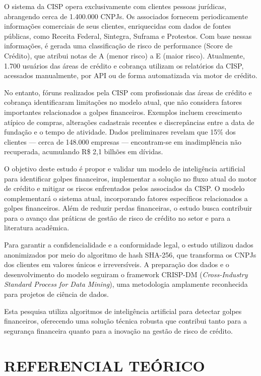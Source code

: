 \documentclass[12pt,a4paper]{article}
\begin{document}
O sistema da CISP opera exclusivamente com clientes pessoas jurídicas, abrangendo cerca de 1.400.000 CNPJs. Os associados fornecem periodicamente informações comerciais de seus clientes, enriquecidas com dados de fontes públicas, como Receita Federal, Sintegra, Suframa e Protestos. Com base nessas informações, é gerada uma classificação de risco de performance (Score de Crédito), que atribui notas de A (menor risco) a E (maior risco). Atualmente, 1.700 usuários das áreas de crédito e cobrança utilizam os relatórios da CISP, acessados manualmente, por API ou de forma automatizada via motor de crédito.

No entanto, fóruns realizados pela CISP com profissionais das áreas de crédito e cobrança identificaram limitações no modelo atual, que não considera fatores importantes relacionados a golpes financeiros. Exemplos incluem crescimento atípico de compras, alterações cadastrais recentes e discrepâncias entre a data de fundação e o tempo de atividade. Dados preliminares revelam que 15\% dos clientes — cerca de 148.000 empresas — encontram-se em inadimplência não recuperada, acumulando R\$ 2,1 bilhões em dívidas.

O objetivo deste estudo é propor e validar um modelo de inteligência artificial para identificar golpes financeiros, implementar a solução no fluxo atual do motor de crédito e mitigar os riscos enfrentados pelos associados da CISP. O modelo complementará o sistema atual, incorporando fatores específicos relacionados a golpes financeiros. Além de reduzir perdas financeiras, o estudo busca contribuir para o avanço das práticas de gestão de risco de crédito no setor e para a literatura acadêmica.

Para garantir a confidencialidade e a conformidade legal, o estudo utilizou dados anonimizados por meio do algoritmo de hash SHA-256, que transforma os CNPJs dos clientes em valores únicos e irreversíveis. A preparação dos dados e o desenvolvimento do modelo seguiram o framework CRISP-DM (\textit{Cross-Industry Standard Process for Data Mining}), uma metodologia amplamente reconhecida para projetos de ciência de dados.

Esta pesquisa utiliza algoritmos de inteligência artificial para detectar golpes financeiros, oferecendo uma solução técnica robusta que contribui tanto para a segurança financeira quanto para a inovação na gestão de risco de crédito.

\newpage
\section{REFERENCIAL TEÓRICO}
\label{sec:referencial}
\end{document}
